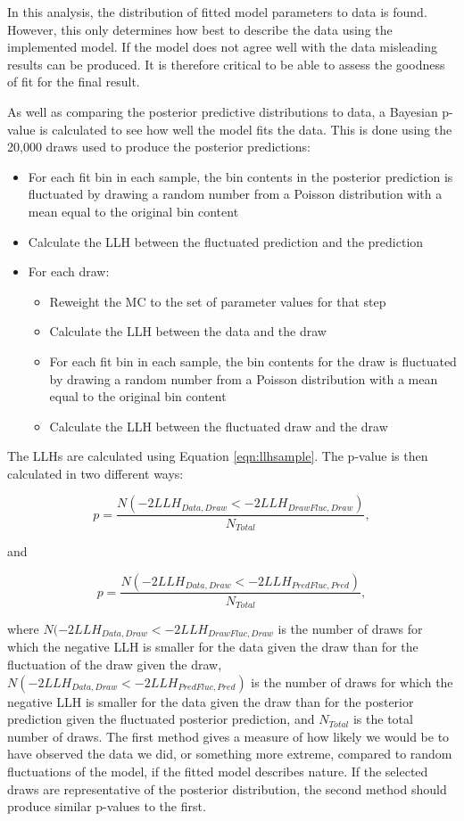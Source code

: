 In this analysis, the distribution of fitted model parameters to data is found. However, this only determines how best to describe the data using the implemented model. If the model does not agree well with the data misleading results can be produced. It is therefore critical to be able to assess the goodness of fit for the final result.

As well as comparing the posterior predictive distributions to data, a Bayesian p-value is calculated to see how well the model fits the data. This is done using the 20,000 draws used to produce the posterior predictions:

\begin{itemize}
	\item For each fit bin in each sample, the bin contents in the posterior prediction is fluctuated by drawing a random number from a Poisson distribution with a mean equal to the original bin content
	\item Calculate the LLH between the fluctuated prediction and the prediction
   \item For each draw:
   \begin{itemize}
   \item Reweight the MC to the set of parameter values for that step
   \item Calculate the LLH between the data and the draw
   \item For each fit bin in each sample, the bin contents for the draw is fluctuated by drawing a random number from a Poisson distribution with a mean equal to the original bin content
  \item Calculate the LLH between the fluctuated draw and the draw
  \end{itemize}
\end{itemize}

The LLHs are calculated using Equation \ref{eqn:llhsample}. The p-value is then calculated in two different ways:

\begin{equation}
p = \frac{N(-2LLH_{Data, Draw} < -2LLH_{Draw Fluc, Draw})}{N_{Total}},
\end{equation}

and

\begin{equation}
p = \frac{N(-2LLH_{Data, Draw} < -2LLH_{Pred Fluc, Pred})}{N_{Total}},
\end{equation}

where $N(-2LLH_{Data, Draw} < -2LLH_{Draw Fluc, Draw}$ is the number of draws for which the negative LLH is smaller for the data given the draw than for the fluctuation of the draw given the draw, $N(-2LLH_{Data, Draw} < -2LLH_{Pred Fluc, Pred})$ is the number of draws for which the negative LLH is smaller for the data given the draw than for the posterior prediction given the fluctuated posterior prediction, and $N_{Total}$ is the total number of draws. The first method gives a measure of how likely we would be to have observed the data we did, or something more extreme, compared to random fluctuations of the model, if the fitted model describes nature. If the selected draws are representative of the posterior distribution, the second method should produce similar p-values to the first.

